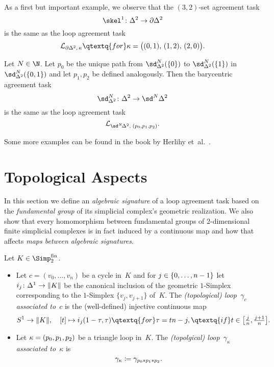\begin{thExample}
    \label{ch3:32setagreement}
    As a first but important example, we observe that the
    $(3,2)$-set agreement task 
    \[ \skel^1\colon\Delta^2\to\partial\Delta^2 \]
    is the same as the loop agreement task
    \[ \Loop{\partial\Delta^2,\,\kappa}
        \qtextq{for}
        \kappa = \bigl( (0,1),\, (1,2),\, (2,0) \bigr)
    . \]
\end{thExample}

\begin{thExample}
    \label{ch3:2dimbaryagreement}
    Let $N\in\N$. Let $p_0$ be the unique path from $\sd_{\Delta^2}^N(\{0\})$
    to $\sd_{\Delta^2}^N(\{1\})$ in $\sd_{\Delta^2}^N(\{0,1\})$ and let
    $p_1,p_2$ be defined analogously. Then the barycentric agreement task
    \[ \sd_{\Delta^2}^N\colon \Delta^2 \to \sd^N \Delta^2 \]
    is the same as the loop agreement task
    \[ \Loop{\sd^N\!\Delta^2, \; (p_0,p_1,p_2)}  . \]
\end{thExample}

Some more examples can be found in the book by
Herlihy et~al.~\cite[Sec.~5.6.3]{bookc:herlihyetal13}.

\section{Topological Aspects}
In this section we define an \emph{algebraic signature} of a loop agreement task
based on the \emph{fundamental group} of its simplicial complex's geometric
realization. We also show that every homomorphism between fundamental groups
of $2$-dimensional finite simplicial complexes  %
is in fact induced by a continuous map and how that affects \emph{maps between
algebraic signatures}.

\begin{thDef}
    \label{ch3:def:assoctopoloop}
    Let $K\in\finSimp$.
    \begin{itemize}
        \item
            Let $c=(v_0,\dots,v_n)$ be a cycle in~$K$ and for
            $j\in\{0,\ldots,n-1\}$ let $i_j\colon\Delta^1\to\lVert K\rVert$ be the
            canonical inclusion of the geometric $1$-Simplex corresponding to
            the $1$-Simplex $\{v_j,v_{j+1}\}$ of~$K$.
            The \emph{(topological) loop~$\gamma_c$ associated to~$c$} is the
            (well-defined) injective continuous map
            \[
                S^1\to\geom K, \quad
                [t]\mapsto i_j(1-\tau,\tau) \qtextq{for} \tau=tn-j,
                    \qtextq{if} t\in\bigl[\tfrac{j}{n}, \tfrac{j+1}{n}\bigr]
            . \]
            
        \item
            Let $\kappa=(p_0,p_1,p_2)$ be a triangle loop in~$K$. The \emph{(topolgical)
            loop~$\gamma_\kappa$ associated to~$\kappa$} is
            \[ \gamma_\kappa \coloneqq \gamma_{p_0\ast p_1\ast p_2}  . \]
    \end{itemize}
\end{thDef}

